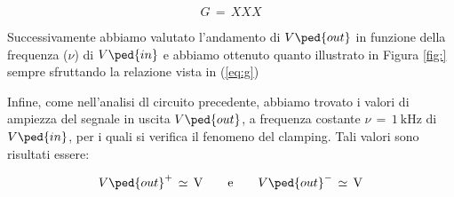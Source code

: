 \begin{equation}
        G\,=\, XXX
\end{equation}

Successivamente abbiamo valutato l'andamento di $V\ped{out}$ in funzione della frequenza ($\nu$) di $V\ped{in}$ e abbiamo ottenuto quanto illustrato in Figura \ref{fig:} sempre sfruttando la relazione vista in (\ref{eq:g})

Infine, come nell'analisi dl circuito precedente, abbiamo trovato i valori di ampiezza del segnale in uscita $V\ped{out}$, a frequenza costante $\nu\,=\,\SI{1}{\kilo\hertz}$ di $V\ped{in}$, per i quali si verifica il fenomeno del clamping. Tali valori sono risultati essere:

\begin{equation}
        V\ped{out}^+\,\simeq\,\SI{}{\volt} \qquad \text{e} \qquad V\ped{out}^-\,\simeq\,\SI{}{\volt}
\end{equation}
















